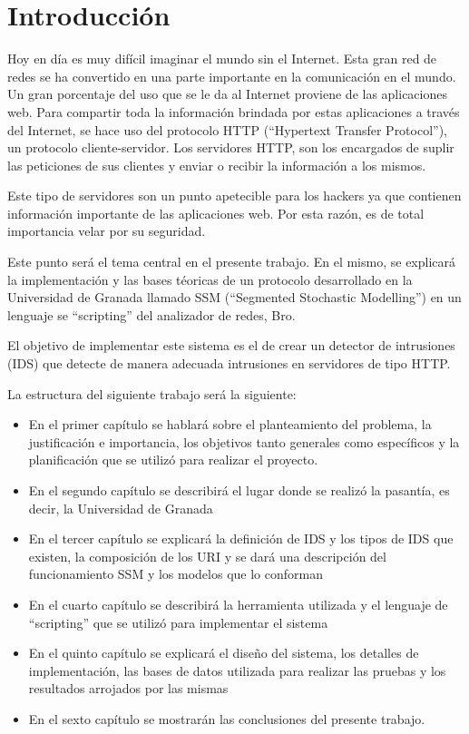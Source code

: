 \chapter*{Introducción}
\label{intro}


Hoy en día es muy difícil imaginar el mundo sin el Internet. Esta gran red de
redes se ha convertido en una parte importante en la comunicación en el mundo.
Un gran porcentaje del uso que se le da al Internet proviene de las aplicaciones
web. Para compartir toda la información brindada por estas aplicaciones a través del Internet, se hace uso del protocolo HTTP (``Hypertext Transfer Protocol''), un protocolo cliente-servidor. Los servidores HTTP, son los encargados de suplir las peticiones de sus clientes y enviar o recibir la información a los mismos.

Este tipo de servidores son un punto apetecible para los hackers ya que contienen información importante de las aplicaciones web. Por esta razón, es de total importancia velar por su seguridad.

Este punto será el tema central en el presente trabajo. En el
mismo, se explicará la implementación y las bases téoricas de un protocolo desarrollado en
la Universidad de Granada llamado SSM (``Segmented Stochastic Modelling'') en un
lenguaje se ``scripting'' del analizador de redes, Bro.

El objetivo de implementar este sistema es el de crear un detector de intrusiones
(IDS) que detecte de manera adecuada intrusiones en servidores de tipo
HTTP.

La estructura del siguiente trabajo será la siguiente:

\begin{itemize}
\item En el primer capítulo se hablará sobre el planteamiento del problema, la justificación e importancia, 
los objetivos tanto generales como específicos y la planificación que se utilizó para
realizar el proyecto.
\item En el segundo capítulo se describirá el lugar donde se realizó la pasantía, es decir, la Universidad de Granada
\item En el tercer capítulo se explicará la definición de IDS y
los tipos de IDS que existen, la composición de los URI y se dará una descripción del funcionamiento SSM y los modelos que lo conforman
\item En el cuarto capítulo se describirá la herramienta utilizada
y el lenguaje de ``scripting'' que se utilizó para implementar el sistema
\item En el quinto capítulo se explicará el diseño del sistema, los detalles de implementación, las bases de datos utilizada para realizar las pruebas y los resultados arrojados por las mismas
\item En el sexto capítulo se mostrarán las conclusiones del presente trabajo.
\end{itemize}







